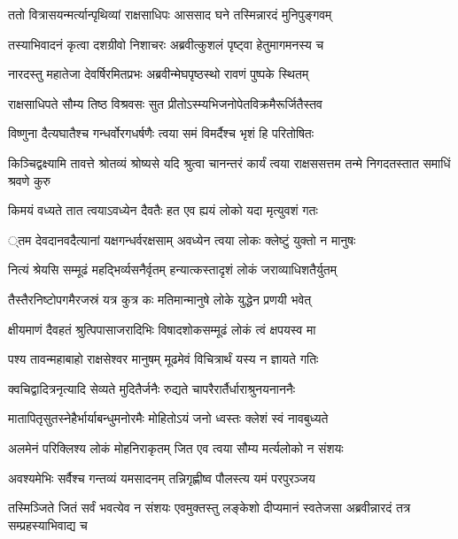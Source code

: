 
\twolineshloka
{ततो वित्रासयन्मर्त्यान्पृथिव्यां राक्षसाधिपः}
{आससाद घने तस्मिन्नारदं मुनिपुङ्गवम्} %

\twolineshloka
{तस्याभिवादनं कृत्वा दशग्रीवो निशाचरः}
{अब्रवीत्कुशलं पृष्ट्वा हेतुमागमनस्य च} %

\twolineshloka
{नारदस्तु महातेजा देवर्षिरमितप्रभः}
{अब्रवीन्मेघपृष्ठस्थो रावणं पुष्पके स्थितम्} %

\twolineshloka
{राक्षसाधिपते सौम्य तिष्ठ विश्रवसः सुत}
{प्रीतोऽस्म्यभिजनोपेतविक्रमैरूर्जितैस्तव} %

\twolineshloka
{विष्णुना दैत्यघातैश्च गन्धर्वोरगधर्षणैः}
{त्वया समं विमर्दैश्च भृशं हि परितोषितः} %

\threelineshloka
{किञ्चिद्वक्ष्यामि तावत्ते श्रोतव्यं श्रोष्यसे यदि}
{श्रुत्वा चानन्तरं कार्यं त्वया राक्षससत्तम}
{तन्मे निगदतस्तात समाधिं श्रवणे कुरु} %

\twolineshloka
{किमयं वध्यते तात त्वयाऽवध्येन दैवतैः}
{हत एव ह्ययं लोको यदा मृत्युवशं गतः} %

\threelineshloka
{्तम}
{देवदानवदैत्यानां यक्षगन्धर्वरक्षसाम्}
{अवध्येन त्वया लोकः क्लेष्टुं युक्तो न मानुषः} %

\twolineshloka
{नित्यं श्रेयसि सम्मूढं महद्भिर्व्यसनैर्वृतम्}
{हन्यात्कस्तादृशं लोकं जराव्याधिशतैर्युतम्} %

\twolineshloka
{तैस्तैरनिष्टोपगमैरजस्रं यत्र कुत्र कः}
{मतिमान्मानुषे लोके युद्धेन प्रणयी भवेत्} %

\twolineshloka
{क्षीयमाणं दैवहतं श्रुत्पिपासाजरादिभिः}
{विषादशोकसम्मूढं लोकं त्वं क्षपयस्व मा} %

\twolineshloka
{पश्य तावन्महाबाहो राक्षसेश्वर मानुषम्}
{मूढमेवं विचित्रार्थं यस्य न ज्ञायते गतिः} %

\twolineshloka
{क्वचिद्वादित्रनृत्यादि सेव्यते मुदितैर्जनैः}
{रुद्यते चापरैरार्तैर्धाराश्रुनयनाननैः} %

\twolineshloka
{मातापितृसुतस्नेहैर्भार्याबन्धुमनोरमैः}
{मोहितोऽयं जनो ध्वस्तः क्लेशं स्वं नावबुध्यते} %

\twolineshloka
{अलमेनं परिक्लिश्य लोकं मोहनिराकृतम्}
{जित एव त्वया सौम्य मर्त्यलोको न संशयः} %

\twolineshloka
{अवश्यमेभिः सर्वैश्च गन्तव्यं यमसादनम्}
{तन्निगृह्णीष्व पौलस्त्य यमं परपुरञ्जय} %

\threelineshloka
{तस्मिञ्जिते जितं सर्वं भवत्येव न संशयः}
{एवमुक्तस्तु लङ्केशो दीप्यमानं स्वतेजसा}
{अब्रवीन्नारदं तत्र सम्प्रहस्याभिवाद्य च} %

